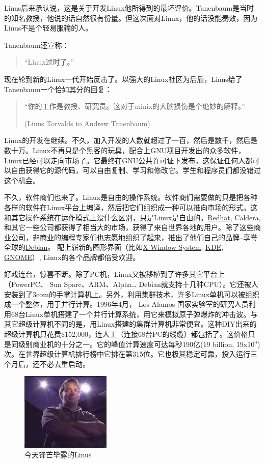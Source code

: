 \documentclass[12pt,a4paper]{article}
\begin{document}
  Linus后来承认说，这是关于开发Linux他所得到的最坏评价。Tanenbaum是当时的知名教授，他说的话自然很有份量。但这次面对Linux，他的话没能奏效，因为Linus不是个轻易服输的人。
  
  Tanenbaum还宣称：
\begin{verse}
“Linux过时了。”  \\
\end{verse}

  现在轮到新的Linux一代开始反击了。以强大的Linux社区为后盾，Linus给了Tanenbaum一个恰如其分的回复：
\begin{quote}
“你的工作是教授、研究员。这对于minix的大脑损伤是个绝妙的解释。”

(Linus Torvalds to Andrew Tanenbaum)
\end{quote}

  Linux的开发在继续。不久，加入开发的人数就超过了一百，然后是数千，然后是数十万。Linux不再只是个黑客的玩具，配合上GNU项目开发出的众多软件，Linux已经可以走向市场了。它最终在GNU公共许可证下发布，这保证任何人都可以自由获得它的源代码，可以自由复制、学习和修改它。学生和程序员们都没错过这个机会。

  不久，软件商们也来了。Linux是自由的操作系统。软件商们需要做的只是把各种各样的软件在Linux平台上编译，然后把它们组织成一种可以推向市场的形式。这和其它操作系统在运作模式上没什么区别，只是Linux是自由的。\href{http://redhat.com/}{Redhat}, Caldera, 和其它一些公司都获得了相当大的市场，获得了来自世界各地的用户。除了这些商业公司，非商业的编程专家们也志愿地组织了起来，推出了他们自己的品牌--享誉全球的\href{http://www.debian.org}{Debian}。 配上崭新的图形界面（比如\href{http://www.x.org/}{X Window System}, \href{http://www.kde.org/}{KDE}, \href{http://www.gnome.org/}{GNOME}）, Linux的各个品牌都倍受欢迎。

  好戏连台，惊喜不断。除了PC机，Linux又被移植到了许多其它平台上（PowerPC、 Sun Sparc、ARM、Alpha\ldots{} Debian就支持十几种CPU）。它还被人安装到了3com的手掌计算机上。另外，利用集群技术，许多Linux单机可以被组织成一个整体，用于并行计算。1996年4月， Los Alamos 国家实验室的研究人员利用68台Linux单机搭建了一个并行计算系统，用它来模拟原子弹爆炸的冲击波。与其它超级计算机不同的是，用Linux搭建的集群计算机非常便宜。这种DIY出来的超级计算机只花费\$152,000，连人工（连接68台PC的线缆）都包括了。这价格只是同级别商业机的十分之一。它的峰值计算速度可达每秒190亿(19 billion, 19x10$^9$) 次。在世界超级计算机排行榜中它排在第315位。它也极其稳定可靠，投入运行三个月后，还不必去重启动。

  \begin{figure}[h!]
  \centering
  \includegraphics[width=0.38\textwidth]{./figs/linusnow2.png}
  \caption{今天锋芒毕露的Linus}
  \end{figure}
\end{document}
